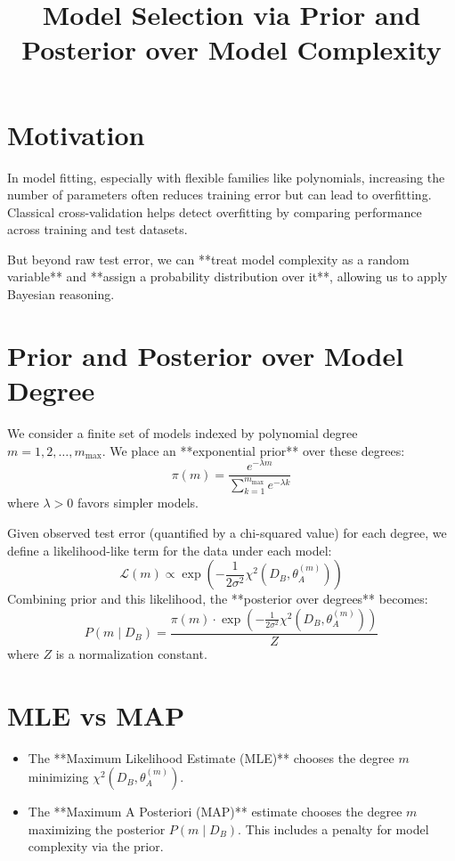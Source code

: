 \documentclass[11pt]{article}
\title{Model Selection via Prior and Posterior over Model Complexity}
\author{}
\date{}
\begin{document}
\maketitle

\section*{Motivation}

In model fitting, especially with flexible families like polynomials, increasing the number of parameters often reduces training error but can lead to overfitting. Classical cross-validation helps detect overfitting by comparing performance across training and test datasets.

But beyond raw test error, we can **treat model complexity as a random variable** and **assign a probability distribution over it**, allowing us to apply Bayesian reasoning.

\section*{Prior and Posterior over Model Degree}

We consider a finite set of models indexed by polynomial degree \( m = 1, 2, \dots, m_{\max} \). We place an **exponential prior** over these degrees:
\[
\pi(m) = \frac{e^{-\lambda m}}{\sum_{k=1}^{m_{\max}} e^{-\lambda k}}
\]
where \( \lambda > 0 \) favors simpler models.

Given observed test error (quantified by a chi-squared value) for each degree, we define a likelihood-like term for the data under each model:
\[
\mathcal{L}(m) \propto \exp\left( -\frac{1}{2 \sigma^2} \chi^2(D_B, \theta_A^{(m)}) \right)
\]
Combining prior and this likelihood, the **posterior over degrees** becomes:
\[
P(m \mid D_B) = \frac{ \pi(m) \cdot \exp\left( -\frac{1}{2 \sigma^2} \chi^2(D_B, \theta_A^{(m)}) \right) }{Z}
\]
where \( Z \) is a normalization constant.

\section*{MLE vs MAP}

\begin{itemize}
    \item The **Maximum Likelihood Estimate (MLE)** chooses the degree \( m \) minimizing \( \chi^2(D_B, \theta_A^{(m)}) \).
    \item The **Maximum A Posteriori (MAP)** estimate chooses the degree \( m \) maximizing the posterior \( P(m \mid D_B) \). This includes a penalty for model complexity via the prior.
\end{itemize}
\end{document}
